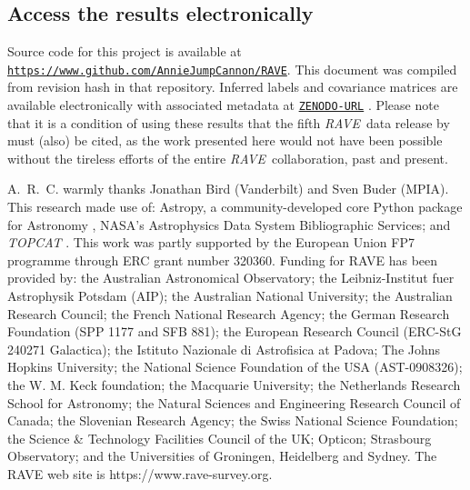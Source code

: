 \documentclass[preprint,trackchanges]{aastex}
\newcommand{\project}[1]{\textsl{#1}}
\newcommand{\acronym}[1]{{\small{#1}}}
\newcommand{\rave}{\project{\acronym{RAVE}}}
\begin{document}
\subsection*{Access the results electronically}

Source code for this project is available at \texttt{\url{https://www.github.com/AnnieJumpCannon/RAVE}}.  
This document was compiled from revision hash \texttt{\githash} in that repository.
Inferred labels and covariance matrices are available electronically with 
associated metadata at \texttt{\url{ZENODO-URL}} \citep{DATA_REPOSITORY}.  
Please note that it is a condition of using these results that the fifth \rave\ 
data release by \citet{Kunder_2016} must (also) be cited, as the work presented 
here would not have been possible without the tireless efforts of the entire 
\rave\ collaboration, past and present.


\acknowledgements
A.~R.~C. warmly thanks Jonathan Bird (Vanderbilt) and Sven Buder (MPIA).
This research made use of: Astropy, a community-developed core Python package for
Astronomy \citep{astropy}, NASA's Astrophysics Data System Bibliographic Services;
and \project{TOPCAT} \citep{Taylor_2005}.
This work was partly supported by the European Union FP7 programme through ERC 
grant number 320360.
Funding for RAVE has been provided by: the Australian Astronomical Observatory; 
the Leibniz-Institut fuer Astrophysik Potsdam (AIP); the Australian National 
University; the Australian Research Council; the French National Research Agency;
the German Research Foundation (SPP 1177 and SFB 881); the European Research 
Council (ERC-StG 240271 Galactica); the Istituto Nazionale di Astrofisica at 
Padova; The Johns Hopkins University; the National Science Foundation of the USA
(AST-0908326); the W. M. Keck foundation; the Macquarie University; the 
Netherlands Research School for Astronomy; the Natural Sciences and Engineering 
Research Council of Canada; the Slovenian Research Agency; the Swiss National 
Science Foundation; the Science \& Technology Facilities Council of the UK; 
Opticon; Strasbourg Observatory; and the Universities of Groningen, Heidelberg 
and Sydney. The RAVE web site is https://www.rave-survey.org.  
\end{document}
